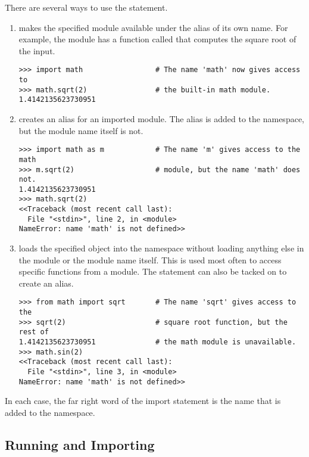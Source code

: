 There are several ways to use the  statement.
\begin{enumerate}

\item {} makes the specified module available under the alias of its own name. For example, the  module has a function called  that computes the square root of the input.
\begin{lstlisting}
>>> import math                 # The name 'math' now gives access to
>>> math.sqrt(2)                # the built-in math module.
1.4142135623730951
\end{lstlisting}

\item {} creates an alias for an imported module. The alias is added to the namespace, but the module name itself is not.

\begin{lstlisting}
>>> import math as m            # The name 'm' gives access to the math
>>> m.sqrt(2)                   # module, but the name 'math' does not.
1.4142135623730951
>>> math.sqrt(2)
<<Traceback (most recent call last):
  File "<stdin>", line 2, in <module>
NameError: name 'math' is not defined>>
\end{lstlisting}

\item {} loads the specified object into the namespace without loading anything else in the module or the module name itself.
This is used most often to access specific functions from a module.
The  statement can also be tacked on to create an alias.

\begin{lstlisting}
>>> from math import sqrt       # The name 'sqrt' gives access to the
>>> sqrt(2)                     # square root function, but the rest of
1.4142135623730951              # the math module is unavailable.
>>> math.sin(2)
<<Traceback (most recent call last):
  File "<stdin>", line 3, in <module>
NameError: name 'math' is not defined>>
\end{lstlisting}
\end{enumerate}

In each case, the far right word of the import statement is the name that is added to the namespace.

\subsection*{Running and Importing} %

